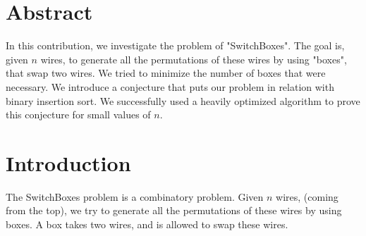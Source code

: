 \documentclass[11pt, a4paper]{article}
\begin{document}
\section{Abstract}
In this contribution, we investigate the problem of "SwitchBoxes".
The goal is, given $n$ wires, to generate all the permutations of these wires by using "boxes", that swap two wires. We tried to minimize the number of boxes that were necessary.
We introduce a conjecture that puts our problem in relation with binary insertion sort. We successfully used a heavily optimized algorithm to prove this conjecture for small values of $n$.

\section{Introduction}
The SwitchBoxes problem is a combinatory problem. Given $n$ wires, (coming from the top), we try to generate all the permutations of these wires by using boxes. A box takes two wires, and is allowed to swap these wires.
\end{document}
